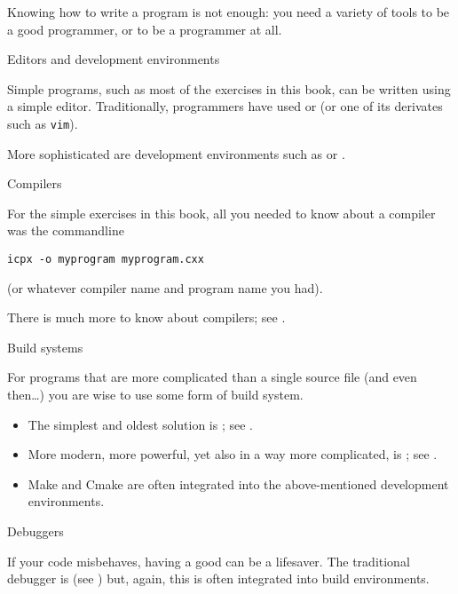 
\lstset{language=Bash}

Knowing how to write a program is not enough: you need a variety of tools
to be a good programmer, or to be a programmer at all.

 {Editors and development environments}

Simple programs, such as most of the exercises in this book,
can be written using a simple editor.
Traditionally, programmers have used 
or  (or one of its derivates such as \texttt{vim}).

More sophisticated are development environments such as
or .

 {Compilers}

For the simple exercises in this book,
all you needed to know about a compiler
was the commandline
\begin{lstlisting}
icpx -o myprogram myprogram.cxx
\end{lstlisting}
(or whatever compiler name and program name you had).

There is much more to know about compilers;
see .

 {Build systems}

For programs that are more complicated than a single source file
(and even then\dots)
you are wise to use some form of build system.
\begin{itemize}
\item The simplest and oldest solution is ;
  see .
\item More modern, more powerful, yet also in a way more complicated,
  is ; see .
\item Make and Cmake are often integrated into the above-mentioned
  development environments.
\end{itemize}

 {Debuggers}

If your code misbehaves, having a good 
can be a lifesaver.
The traditional debugger is 
(see )
but, again, this is often integrated into build environments.

